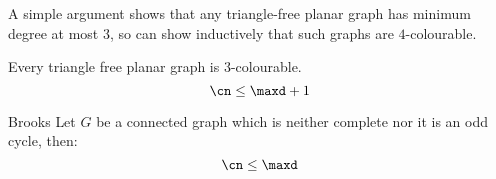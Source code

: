 \begin{coolfact}
    A simple argument shows that any triangle-free planar graph has minimum degree at most $3$, so can show inductively that such graphs are $4$-colourable.
\end{coolfact}
\begin{customtheorem}{9.5}
\label{theorem:9.5}
    Every triangle free planar graph is $3$-colourable.
    \begin{equation*}
        \cn \leq \maxd + 1
    \end{equation*}
\end{customtheorem}
\begin{customtheorem}{Brooks}
\label{theorem:brooks}
    Let $G$ be a connected graph which is neither complete nor it is an odd cycle, then:
    \begin{equation*}
        \cn \leq \maxd
    \end{equation*}
\end{customtheorem}
